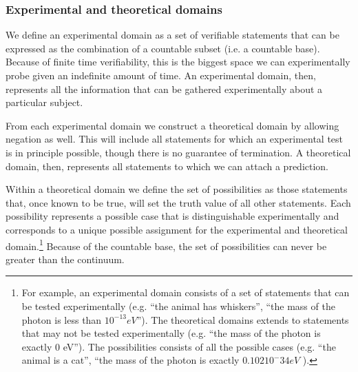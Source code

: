 \documentclass[twocolumn]{article}
\newif\ifextended
\newcommand\fact[2]{\ifextended \emph{#1}. #2 \fi}
\begin{document}
\fact{Different algebra}{Verifiable statements do not follow the standard Boolean algebra. The negation of a verifiable statement is not necessarily verifiable since the test is not guaranteed to terminate. The conjunction of a finite set of verifiable statements is necessarily verifiable since we can run the tests one by one and, if all are successful, the conjunction is also verified. This cannot be extended to an infinite set since the test would not terminate. The disjunction of a countable set of verifiable statements is necessarily verifiable since, once one test terminates, the disjunction is verified and we can stop. This cannot be extended to an infinite set that is more than countable since we would not be able to find the test that terminates in a finite time.}

\fact{Decidable statements}{These are statements that can be verified and falsified. That is, their test always terminates. These can be defined from verifiable statements and they follow a finite Boolean algebra: the negation, finite conjunction and finite disjunction of decidable statements is also decidable.}


\subsubsection{Experimental and theoretical domains}

We define an experimental domain as a set of verifiable statements that can be expressed as the combination of a countable subset (i.e. a countable base). Because of finite time verifiability, this is the biggest space we can experimentally probe given an indefinite amount of time. An experimental domain, then, represents all the information that can be gathered experimentally about a particular subject.

From each experimental domain we construct a theoretical domain by allowing negation as well. This will include all statements for which an experimental test is in principle possible, though there is no guarantee of termination. A theoretical domain, then, represents all statements to which we can attach a prediction.

Within a theoretical domain we define the set of possibilities as those statements that, once known to be true, will set the truth value of all other statements. Each possibility represents a possible case that is distinguishable experimentally and corresponds to a unique possible assignment for the experimental and theoretical domain.\footnote{For example, an experimental domain consists of a set of statements that can be tested experimentally (e.g. ``the animal has whiskers'', ``the mass of the photon is less than $10^{-13} eV$''). The theoretical domains extends to statements that may not be tested experimentally (e.g. ``the mass of the photon is exactly 0 eV''). The possibilities consists of all the possible cases (e.g. ``the animal is a cat'', ``the mass of the photon is exactly $0.102 10^-{34} eV$ ).} Because of the countable base, the set of possibilities can never be greater than the continuum.
\end{document}
